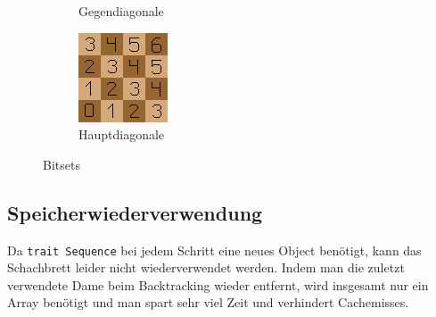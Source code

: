 \begin{figure}
\begin{subfigure}{0.3\linewidth}
    \caption{Gegendiagonale}
  \end{subfigure}
  \begin{subfigure}{0.3\linewidth}
    \includegraphics[width=\linewidth]{../img/right_diagonals.png}
    \caption{Hauptdiagonale}
  \end{subfigure}
  \caption{Bitsets}
  \label{bitsets}
\end{figure}

\subsection{Speicherwiederverwendung}
Da \texttt{trait Sequence} bei jedem Schritt eine neues Object benötigt, kann das
Schachbrett leider nicht wiederverwendet werden. Indem man die zuletzt verwendete Dame beim Backtracking
wieder entfernt, wird insgesamt nur ein Array benötigt und man spart sehr viel Zeit und verhindert Cachemisses.

